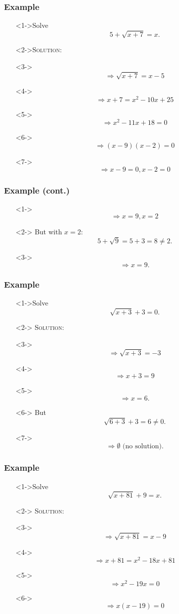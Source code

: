 \documentclass[handout]{beamer}
\begin{document}
\begin{frame}
	\frametitle{Example}
	\begin{enumerate}
		\item[]<1->Solve
		\[
			5+\sqrt{x+7}=x.
		\]
		\item[]<2->\textsc{Solution:}
		\item[]<3-> \[ \Rightarrow \sqrt{x+7}=x-5 \]
		\item[]<4-> \[ \Rightarrow x+7=x^{2}-10x+25 \]
		\item[]<5-> \[ \Rightarrow x^{2}-11x+18=0 \]
		\item[]<6-> \[ \Rightarrow (x-9)(x-2)=0 \]
		\item[]<7-> \[ \Rightarrow x-9=0, x-2=0 \]
	\end{enumerate}
\end{frame}

\begin{frame}
	\frametitle{Example (cont.)}
	\begin{enumerate}
		\item[]<1-> \[ \Rightarrow x=9, x=2 \]
		\item[]<2-> But with $x=2:$
		\[
			5+\sqrt{9}=5+3=8 \neq 2.
		\]
		\item[]<3-> \[ \Rightarrow x=9. \]
	\end{enumerate}
\end{frame}

\begin{frame}
	\frametitle{Example}
	\begin{enumerate}
		\item[]<1->Solve
		\[
			\sqrt{x+3}+3=0.
		\]
		\item[]<2-> \textsc{Solution:}
		\item[]<3-> \[ \Rightarrow \sqrt{x+3}=-3 \]
		\item[]<4-> \[ \Rightarrow x+3=9 \]
		\item[]<5-> \[ \Rightarrow x=6. \]
		\item[]<6-> But
		\[
			\sqrt{6+3}+3=6 \neq 0.
		\]
		\item[]<7->
		\[
			\Rightarrow \emptyset \text{ (no solution)}.
		\]
	\end{enumerate}
\end{frame}

\begin{frame}
	\frametitle{Example}
	\begin{enumerate}
		\item[]<1->Solve
		\[
			\sqrt{x+81}+9=x.
		\]
		\item[]<2-> \textsc{Solution:}
		\item[]<3-> \[ \Rightarrow \sqrt{x+81}=x-9 \]
		\item[]<4-> \[ \Rightarrow x+81=x^{2}-18x+81 \]
		\item[]<5-> \[ \Rightarrow x^{2}-19x=0 \]
		\item[]<6-> \[ \Rightarrow x(x-19)=0 \]
	\end{enumerate}
\end{frame}
\end{document}
